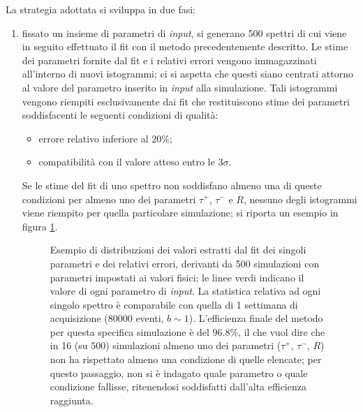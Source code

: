 \documentclass[10pt, oneside, a4paper]{article}   	%
\begin{document}
\newpage La strategia adottata si sviluppa in due fasi:
\begin{enumerate}
 \item fissato un insieme di parametri di \textit{input}, si generano 500 spettri di cui viene in seguito effettuato il fit con il metodo precedentemente descritto. Le stime dei parametri fornite dal fit e i relativi errori vengono immagazzinati all'interno di nuovi istogrammi; ci si aspetta che questi siano centrati attorno al valore del parametro inserito in \textit{input} alla simulazione. Tali istogrammi vengono riempiti esclusivamente dai fit che restituiscono stime dei parametri soddisfacenti le seguenti condizioni di qualità:
 \begin{itemize}
  \item errore relativo inferiore al $20\%$;
  \item compatibilità con il valore atteso entro le $3\sigma$. 
 \end{itemize}
 Se le stime del fit di uno spettro non soddisfano almeno una di queste condizioni per almeno uno dei parametri $\tau^+$, $\tau^-$ e $R$, nessuno degli istogrammi viene riempito per quella particolare simulazione; si riporta un esempio in figura \ref{fig::esempio_set_simulazioni}.
%
\begin{figure}[b!]
  \centering
  
  \caption{Esempio di distribuzioni dei valori estratti dal fit dei singoli parametri e dei relativi errori, derivanti da 500 simulazioni con parametri impostati ai valori fisici; le linee verdi indicano il valore di ogni parametro di \textit{input}. La statistica relativa ad ogni singolo spettro è comparabile con quella di 1 settimana di acquisizione ($ 80000$ eventi, $b\sim1$). L'efficienza finale del metodo per questa specifica simulazione è del $96.8\%$, il che vuol dire che in 16 (su 500) simulazioni almeno uno dei parametri ($\tau^+$, $\tau^-$, $R$) non ha rispettato almeno una condizione di quelle elencate; per questo passaggio, non si è indagato quale parametro o quale condizione fallisse, ritenendosi soddisfatti dall'alta efficienza raggiunta.}
  \label{fig::esempio_set_simulazioni}
 \end{figure}
 

\end{enumerate}
\end{document}
